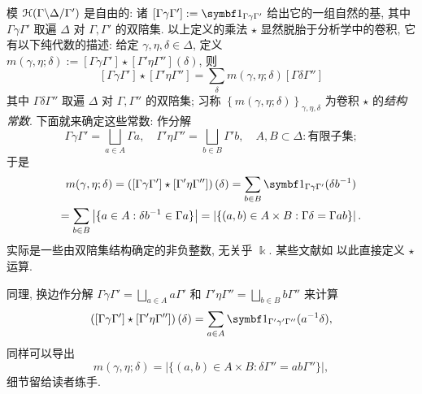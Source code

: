 \begin{remark}[结构常数]\label{rem:convolution-concrete}
	 
	模 $\EuScript{H}(\Gamma \backslash \Delta / \Gamma')$ 是自由的: 诸 $[\Gamma \gamma \Gamma'] := \charfcn_{\Gamma \gamma \Gamma'}$ 给出它的一组自然的基, 其中 $\Gamma \gamma \Gamma'$ 取遍 $\Delta$ 对 $\Gamma, \Gamma'$ 的双陪集. 以上定义的乘法 $\star$ 显然脱胎于分析学中的卷积, 它有以下纯代数的描述: 给定 $\gamma, \eta, \delta \in \Delta$, 定义 $m(\gamma, \eta; \delta) := [\Gamma\gamma\Gamma'] \star [\Gamma'\eta\Gamma''] (\delta)$, 则
	\[ [\Gamma\gamma\Gamma'] \star [\Gamma'\eta\Gamma''] = \sum_\delta m(\gamma,\eta;\delta) [\Gamma\delta\Gamma''] \]
	其中 $\Gamma\delta\Gamma''$ 取遍 $\Delta$ 对 $\Gamma, \Gamma''$ 的双陪集; 习称 $\left\{ m(\gamma,\eta; \delta) \right\}_{\gamma,\eta,\delta}$ 为卷积 $\star$ 的\emph{结构常数}. 下面就来确定这些常数: 作分解
	\[ \Gamma\gamma\Gamma' = \bigsqcup_{a \in A} \Gamma a, \quad \Gamma'\eta\Gamma'' = \bigsqcup_{b \in B} \Gamma' b, \quad A, B \subset \Delta: \text{有限子集}; \]
	于是
	\begin{multline}\label{eqn:structure-const-1}
		m(\gamma,\eta;\delta) = \left( [\Gamma\gamma\Gamma'] \star [\Gamma'\eta\Gamma''] \right)(\delta) = \sum_{b \in B} \charfcn_{\Gamma\gamma\Gamma'}(\delta b^{-1}) \\
		= \sum_{b \in B} \left| \{ a \in A: \delta b^{-1} \in \Gamma a \} \right|		= \left| \{ (a,b) \in A \times B: \Gamma \delta = \Gamma ab \} \right|.
	\end{multline}
	实际是一些由双陪集结构确定的非负整数, 无关乎 $\Bbbk$. 某些文献如 \cite[(2.7.2)]{Mi89} 以此直接定义 $\star$ 运算.
	
	同理, 换边作分解 $\Gamma\gamma\Gamma' = \bigsqcup_{a \in A} a\Gamma'$ 和 $\Gamma'\eta\Gamma'' = \bigsqcup_{b \in B} b\Gamma''$ 来计算
	\[ \left( [\Gamma\gamma\Gamma'] \star [\Gamma'\eta\Gamma''] \right)(\delta) = \sum_{a \in A} \charfcn_{\Gamma'\gamma'\Gamma''}(a^{-1} \delta), \]
	同样可以导出
	\begin{equation}\label{eqn:structure-const-2}
		m(\gamma,\eta;\delta) = \left| \{ (a,b) \in A \times B: \delta\Gamma'' = ab\Gamma''  \} \right|,
	\end{equation}
	细节留给读者练手.
\end{remark}

